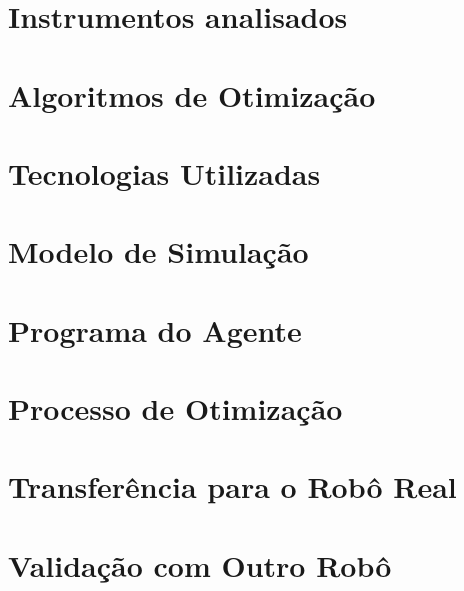 \documentclass[12pt,plainheader,pnumplain]{abnt}
\begin{document}
\chapter{Instrumentos analisados}
\label{chap:instrumentos_analisados}


\chapter{Algoritmos de Otimização}


\chapter{Tecnologias Utilizadas}


\chapter{Modelo de Simulação}


\chapter{Programa do Agente}


\chapter{Processo de Otimização}
\label{chap:processo_otimizacao}


\chapter{Transferência para o Robô Real}


\chapter{Validação com Outro Robô}


%





\end{document}
